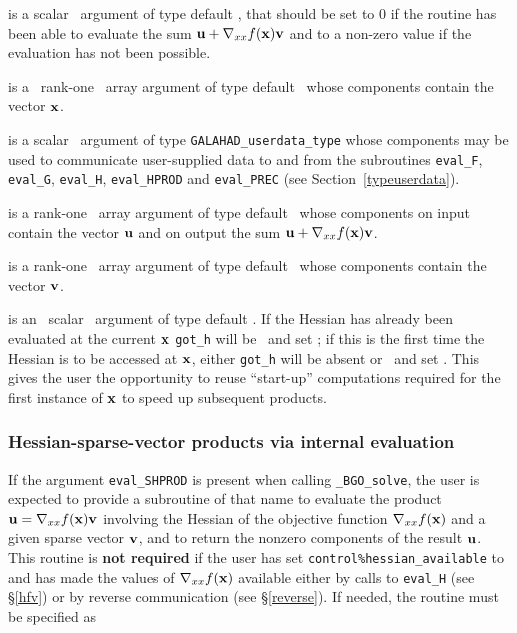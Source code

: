 \documentclass{galahad}
\newcommand{\packagename}{BGO}
\newcommand{\fullpackagename}{\libraryname\_\packagename}
\newcommand{\solver}{{\tt \fullpackagename\_solve}}
\begin{document}
\begin{description}
 is a scalar \intentout\ argument of type default \integer,
that should be set to 0 if the routine has been able to evaluate the
sum ${\mathbf{u}} + \nabla_{xx} f({\mathbf{x}}) {\mathbf{v}}$
and to a non-zero value if the evaluation has not been possible.

 is a \ rank-one \intentin\ array argument of type
default \realdp\ whose components contain the vector ${\mathbf{x}}$.

 is a scalar \intentinout\ argument of type
{\tt GALAHAD\_userdata\_type} whose components may be used
to communicate user-supplied data to and from the
subroutines {\tt eval\_F}, {\tt eval\_G},
{\tt eval\_H}, {\tt eval\_HPROD} and {\tt eval\_PREC}
(see Section~\ref{typeuserdata}).

 is a rank-one \intentinout\ array argument of type default \realdp\
whose components on input contain the vector ${\mathbf{u}}$ and on output the
sum ${\mathbf{u}} + \nabla_{xx} f({\mathbf{x}}) {\mathbf{v}}$.

 is a rank-one \intentin\ array argument of type default \realdp\
whose components contain the vector ${\mathbf{v}}$.

 is an \optional\ scalar \intentin\ argument of type default
\logical. If the Hessian has already been evaluated at the current ${\mathbf{x}}$
{\tt got\_h} will be \present\ and set \true; if this is the first time
the Hessian is to be accessed at ${\mathbf{x}}$, either {\tt got\_h} will be absent
or \present\ and set \false. This gives the user the opportunity
to reuse ``start-up'' computations required for the first instance of
${\mathbf{x}}$ to speed up subsequent products.

\end{description}


\subsubsection{Hessian-sparse-vector products via internal evaluation\label{hvsv}}

If the argument {\tt eval\_SHPROD} is present when calling \solver, the
user is expected to provide a subroutine of that name to evaluate the
product ${\mathbf{u}} = \nabla_{xx} f({\mathbf{x}}) {\mathbf{v}}$ involving
the Hessian of the objective function $\nabla_{xx} f({\mathbf{x}})$
and a given sparse vector ${\mathbf{v}}$, and to return the nonzero components
of the result ${\mathbf{u}}$.
This routine is {\bf not required} if the user has set
{\tt control\%hessian\_available} to \true\, and has made
the values of $\nabla_{xx} f({\mathbf{x}})$ available either by calls to
{\tt eval\_H} (see \S\ref{hfv})
or by reverse communication (see \S\ref{reverse}).
If needed, the routine must be specified as
\end{document}
